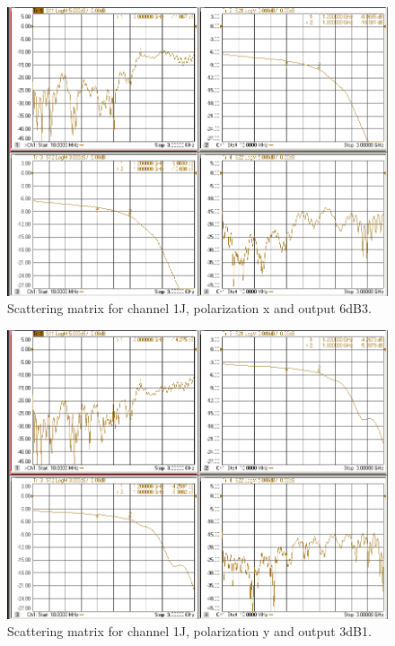 \documentclass[12pt,a4paper,oneside]{article}
\begin{document}
\begin{figure}[H]
\centering
\includegraphics[width=0.9\linewidth]{VNA_results/1Jx_6dB3.png}
\caption{Scattering matrix for channel 1J, polarization x and output 6dB3.}
\label{fig:1Jx_6dB3}
\end{figure}


\begin{figure}[H]
\centering
\includegraphics[width=0.9\linewidth]{VNA_results/1Jy_3dB1.png}
\caption{Scattering matrix for channel 1J, polarization y and output 3dB1.}
\label{fig:1Jy_3dB1}
\end{figure}
\end{document}
